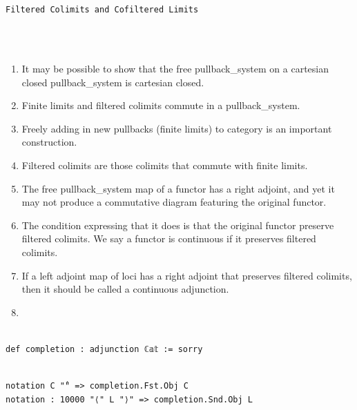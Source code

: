 \documentclass{book}
\theoremstyle{definition}
\newcounter{lcounter}
\renewcommand{\chapter}[1]{
\newpage
{
\Huge 
\begin{center}
\ \\
\ \\
\thispagestyle{empty}
\texttt{#1}
\end{center}}
\ \\
\ \\
}
\begin{document}
\chapter{Filtered Colimits and Cofiltered Limits}

\begin{enumerate}
\item It may be possible to show that the free pullback_system on a cartesian closed pullback_system is cartesian closed.
\item Finite limits and filtered colimits commute in a pullback_system.
\item Freely adding in new pullbacks (finite limits) to category is an important construction.
\item Filtered colimits are those colimits that commute with finite limits.
\item The free pullback_system map of a functor has a right adjoint, and yet it may not produce a commutative diagram featuring the original functor. 
\item The condition expressing that it does is that the original functor preserve filtered colimits. We say a functor is continuous if it preserves filtered colimits.
\item If a left adjoint map of loci has a right adjoint that preserves filtered colimits, then it should be called a continuous adjunction.
\item 
\end{enumerate}

\begin{center}
\begin{tcolorbox}[width=5in,colback={white},title={\begin{center}\texttt{Lean \thelcounter} \addtocounter{lcounter}{1}  \end{center}},colbacktitle=Blue,coltitle=black]
\begin{verbatim}

def completion : adjunction ℂ𝕒𝕥 := sorry

\end{verbatim}
\end{tcolorbox}
\end{center}

\begin{center}
\begin{tcolorbox}[width=5in,colback={white},title={\begin{center}\texttt{Lean \thelcounter} \addtocounter{lcounter}{1}  \end{center}},colbacktitle=Blue,coltitle=black]
\begin{verbatim}

notation C "̂" => completion.Fst.Obj C
notation : 10000 "⟨" L "⟩" => completion.Snd.Obj L

\end{verbatim}
\end{tcolorbox}
\end{center}
\end{document}
